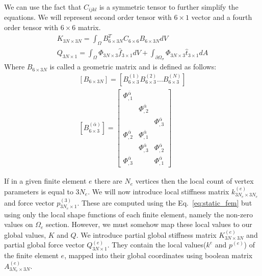 \documentclass[en]{minipw} %
\begin{document}
We can use the fact that $C_{ijkl}$ is a symmetric tensor to further simplify the equations. We will represent second order tensor with $6 \times 1$ vector and a fourth order tensor with $6 \times 6$ matrix.
\begin{equation}
\label{eq:static_fem}
\begin{aligned}
K_{3N \times 3N} = \int_{\Omega} B^{T}_{6 \times 3N} C_{6 \times 6} B_{6 \times 3N} dV 
\\
Q_{3N \times 1} = \int_{\Omega} \Phi_{3N \times 3} \hat{f}_{3 \times 1} dV + \int_{\partial \Omega_{\sigma}} \Phi_{3N \times 3} \hat{t}_{3 \times 1} dA
\end{aligned}
\end{equation}
Where $B_{6 \times 3N}$ is called a geometric matrix and is defined as follows:
\begin{equation}
\label{eq:geometric_matrix}
\begin{aligned}
[B_{6 \times 3N}] = [B^{(1)}_{6 \times 3} B^{(2)}_{6 \times 3} ... B^{(N)}_{6 \times 3}]
\\
[B^{(\bar{\alpha})}_{6 \times 3}] = 
\begin{bmatrix}
\Phi^{\bar{\alpha}}_{,1} & & \\
 & \Phi^{\bar{\alpha}}_{,2} & \\
& & \Phi^{\bar{\alpha}}_{,3} \\
\Phi^{\bar{\alpha}}_{,2} & \Phi^{\bar{\alpha}}_{,1} & \\
& \Phi^{\bar{\alpha}}_{,3} & \Phi^{\bar{\alpha}}_{,2} \\
\Phi^{\bar{\alpha}}_{,3} & & \Phi^{\bar{\alpha}}_{,1}
\end{bmatrix}
\end{aligned}
\end{equation}

If in a given finite element $e$ there are $N_e$ vertices then the local count of vertex parameters is equal to $3N_e$. We will now introduce local stiffness matrix $k^{(e)}_{3N_e \times 3N_e}$ and force vector $p^{(3)}_{3N_e \times 1}$. These are computed using the Eq.~\ref{eq:static_fem} but using only the local shape functions of each finite element, namely the non-zero values on $\Omega_{e}$ section.
However, we must somehow map these local values to our global values, $K$ and $Q$. We introduce partial global stiffness matrix $K^{(e)}_{3N \times 3N}$ and partial global force vector $Q^{(e)}_{3N \times 1}$. They contain the local values($k^{e}$ and $p^{(e)}$) of the finite element $e$, mapped into their global coordinates using boolean matrix $A^{(e)}_{3N_{e} \times 3N}$.
\end{document}
